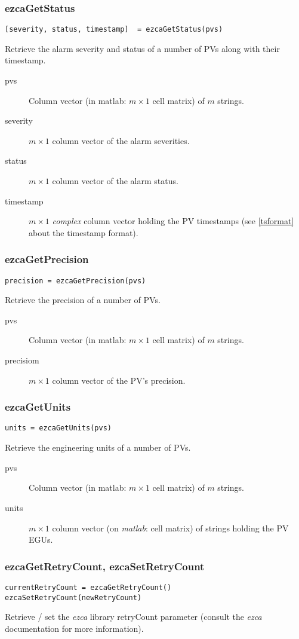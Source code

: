 \documentclass{article}
\newcommand{\matlab}{{\em matlab}}
\newcommand{\ezca}{{\em ezca}}
\newcommand{\PVITEM}{
\item[pvs] Column vector (in matlab: $m\times 1$ cell matrix)
of $m$ strings.
}
\begin{document}
\subsubsection{ezcaGetStatus}
\begin{verbatim}
[severity, status, timestamp]  = ezcaGetStatus(pvs)
\end{verbatim}
Retrieve the alarm severity and status of a number of PVs along
with their timestamp.
\begin{description}
\PVITEM
\item[severity] $m\times 1$ column vector of the alarm severities.
\item[status] $m\times 1$ column vector of the alarm status.
\item[timestamp] $m\times 1$ {\em complex} column vector holding the
PV timestamps (see \ref{tsformat} about the timestamp format).
\end{description}


\subsubsection{ezcaGetPrecision}
\begin{verbatim}
precision = ezcaGetPrecision(pvs)
\end{verbatim}
Retrieve the precision of a number of PVs.
\begin{description}
\PVITEM
\item[precisiom] $m\times 1$ column vector of the PV's precision.
\end{description}

\subsubsection{ezcaGetUnits}
\begin{verbatim}
units = ezcaGetUnits(pvs)
\end{verbatim}
Retrieve the engineering units of a number of PVs.
\begin{description}
\PVITEM
\item[units] $m\times 1$ column vector (on \matlab: cell matrix)
of strings holding the PV EGUs.
\end{description}

\subsubsection{ezcaGetRetryCount, ezcaSetRetryCount}
\begin{verbatim}
currentRetryCount = ezcaGetRetryCount()
ezcaSetRetryCount(newRetryCount)
\end{verbatim}
Retrieve / set the \ezca{} library retryCount parameter (consult the \ezca{}
documentation for more information).
\end{document}
